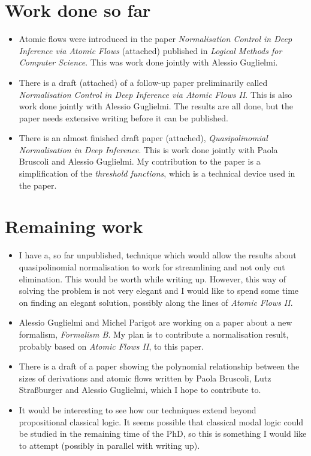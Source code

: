 \documentclass[]{article}
\begin{document}
\section{Work done so far}

\begin{itemize}
\item Atomic flows were introduced in the paper \emph{Normalisation Control in Deep Inference via Atomic Flows} (attached) published in \emph{Logical Methods for Computer Science}. This was work done jointly with Alessio Guglielmi.
\item There is a draft (attached) of a follow-up paper preliminarily called \emph{Normalisation Control in Deep Inference via Atomic Flows II}. This is also work done jointly with Alessio Guglielmi. The results are all done, but the paper needs extensive writing before it can be published.
\item There is an almost finished draft paper (attached), \emph{Quasipolinomial Normalisation in Deep Inference}. This is work done jointly with Paola Bruscoli and Alessio Guglielmi. My contribution to the paper is a simplification of the \emph{threshold functions}, which is a technical device used in the paper.
\end{itemize}

\section{Remaining work}

\begin{itemize}
\item I have a, so far unpublished, technique which would allow the results about quasipolinomial normalisation to work for streamlining and not only cut elimination. This would be worth while writing up. However, this way of solving the problem is not very elegant and I would like to spend some time on finding an elegant solution, possibly along the lines of \emph{Atomic Flows II}.
\item Alessio Guglielmi and Michel Parigot are working on a paper about a new formalism, \emph{Formalism B}. My plan is to contribute a normalisation result, probably based on \emph{Atomic Flows II}, to this paper.
\item There is a draft of a paper showing the polynomial relationship between the sizes of derivations and atomic flows written by Paola Bruscoli, Lutz Stra\ss{}burger and Alessio Guglielmi, which I hope to contribute to.
\item It would be interesting to see how our techniques extend beyond propositional classical logic. It seems possible that classical modal logic could be studied in the remaining time of the PhD, so this is something I would like to attempt (possibly in parallel with writing up).
\end{itemize}
\end{document}
